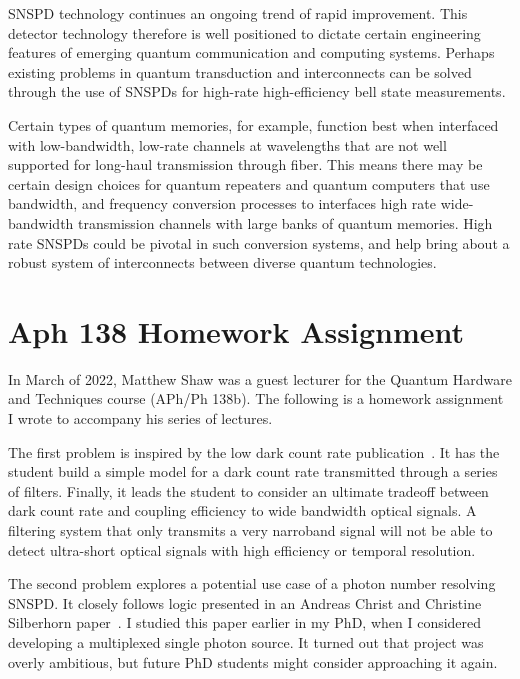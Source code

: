 \documentclass[11pt]{caltech_thesis} %
\begin{document}
SNSPD technology continues an ongoing trend of rapid improvement. This detector technology therefore is well positioned to dictate certain engineering features of emerging quantum communication and computing systems. Perhaps existing problems in quantum transduction and interconnects can be solved through the use of SNSPDs for high-rate high-efficiency bell state measurements.

Certain types of quantum memories, for example, function best when interfaced with low-bandwidth, low-rate channels at wavelengths that are not well supported for long-haul transmission through fiber. This means there may be certain design choices for quantum repeaters and quantum computers that use bandwidth, and frequency conversion processes to interfaces high rate wide-bandwidth transmission channels with large banks of quantum memories. High rate SNSPDs could be pivotal in such conversion systems, and help bring about a robust system of interconnects between diverse quantum technologies.

\appendix

\hypertarget{aph-138-homework-assignment}{%
\chapter{Aph 138 Homework Assignment}\label{aph-138-homework-assignment}}

In March of 2022, Matthew Shaw was a guest lecturer for the Quantum Hardware and Techniques course (APh/Ph 138b). The following is a homework assignment I wrote to accompany his series of lectures.

The first problem is inspired by the low dark count rate publication~\autocite{Mueller:21}. It has the student build a simple model for a dark count rate transmitted through a series of filters. Finally, it leads the student to consider an ultimate tradeoff between dark count rate and coupling efficiency to wide bandwidth optical signals. A filtering system that only transmits a very narroband signal will not be able to detect ultra-short optical signals with high efficiency or temporal resolution.

The second problem explores a potential use case of a photon number resolving SNSPD. It closely follows logic presented in an Andreas Christ and Christine Silberhorn paper~\autocite{Andreas:12}. I studied this paper earlier in my PhD, when I considered developing a multiplexed single photon source. It turned out that project was overly ambitious, but future PhD students might consider approaching it again.
\end{document}
